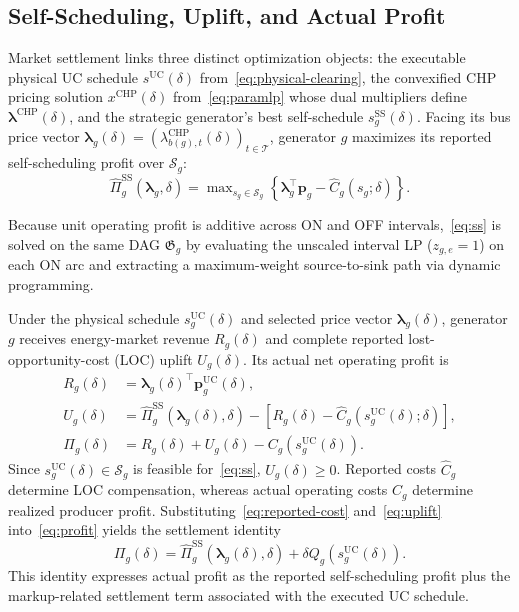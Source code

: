 \documentclass[journal]{IEEEtran}
\newcommand{\bp}{\bm p}
\newcommand{\blambda}{\bm\lambda}
\newcommand{\UC}{\mathrm{UC}}
\newcommand{\SSched}{\mathrm{SS}}
\newcommand{\CHP}{\mathrm{CHP}}
\begin{document}
\subsection{Self-Scheduling, Uplift, and Actual Profit}
Market settlement links three distinct optimization objects: the executable physical UC schedule $s^{\UC}(\delta)$ from~\eqref{eq:physical-clearing}, the convexified CHP pricing solution $x^{\CHP}(\delta)$ from~\eqref{eq:paramlp} whose dual multipliers define $\blambda^{\CHP}(\delta)$, and the strategic generator's best self-schedule $s_g^{\SSched}(\delta)$. Facing its bus price vector $\blambda_g(\delta)=(\lambda_{b(g),t}^{\CHP}(\delta))_{t\in\mathcal{T}}$, generator $g$ maximizes its reported self-scheduling profit over $\mathcal{S}_g$:
\begin{equation}
\widehat{\Pi}_g^{\SSched}(\blambda_g,\delta)
= \max\nolimits_{s_g\in\mathcal{S}_g}
\left\{ \blambda_g^\top\bp_g - \widehat{C}_g(s_g;\delta) \right\}.\label{eq:ss}
\end{equation}

Because unit operating profit is additive across ON and OFF intervals,~\eqref{eq:ss} is solved on the same DAG $\mathfrak{G}_g$ by evaluating the unscaled interval LP ($z_{g,e}=1$) on each ON arc and extracting a maximum-weight source-to-sink path via dynamic programming.

Under the physical schedule $s_g^{\UC}(\delta)$ and selected price vector $\blambda_g(\delta)$, generator $g$ receives energy-market revenue $R_g(\delta)$ and complete reported lost-opportunity-cost (LOC) uplift $U_g(\delta)$. Its actual net operating profit is
\begin{align}
R_g(\delta) &= \blambda_g(\delta)^\top\bp_g^{\UC}(\delta),\label{eq:revenue}\\
U_g(\delta) &= \widehat{\Pi}_g^{\SSched}(\blambda_g(\delta),\delta)
- \left[ R_g(\delta) - \widehat{C}_g(s_g^{\UC}(\delta);\delta) \right],\label{eq:uplift}\\
\Pi_g(\delta) &= R_g(\delta) + U_g(\delta) - C_g(s_g^{\UC}(\delta)).\label{eq:profit}
\end{align}
Since $s_g^{\UC}(\delta)\in\mathcal{S}_g$ is feasible for~\eqref{eq:ss}, $U_g(\delta)\ge 0$. Reported costs $\widehat{C}_g$ determine LOC compensation, whereas actual operating costs $C_g$ determine realized producer profit. Substituting~\eqref{eq:reported-cost} and~\eqref{eq:uplift} into~\eqref{eq:profit} yields the settlement identity
\begin{equation}
\Pi_g(\delta) = \widehat{\Pi}_g^{\SSched}(\blambda_g(\delta),\delta)
+ \delta Q_g(s_g^{\UC}(\delta)).\label{eq:identity}
\end{equation}
This identity expresses actual profit as the reported self-scheduling profit plus the markup-related settlement term associated with the executed UC schedule.
\end{document}
